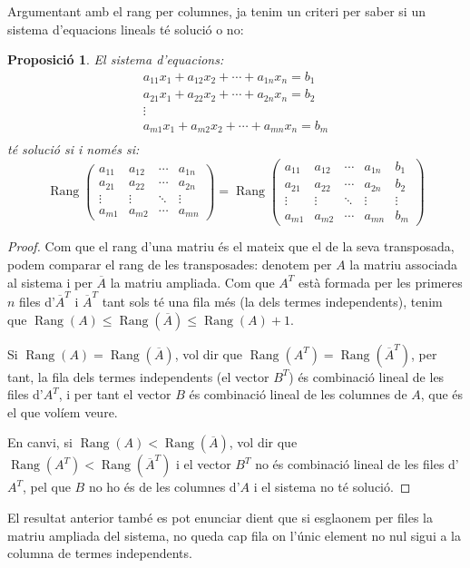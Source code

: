 \documentclass[a4paper,12pt,twoside]{article}
\newcommand{\1}{\mathbf{1}}
\newcommand{\0}{\mathbf{0}}
\DeclareMathOperator{\Rang}{Rang}
\newtheorem{proposicio}[teorema]{Proposició}
\theoremstyle{definition}
\theoremstyle{remark}
\begin{document}
Argumentant amb el rang per columnes, ja tenim un criteri per saber si un sistema d'equacions lineals té solució o no:
\begin{proposicio}
	El sistema d'equacions:
		$$
	\begin{matrix}
	a_{11}x_1+a_{12}x_2+ \cdots + a_{1n}x_n = b_1 \\
	a_{21}x_1+a_{22}x_2+ \cdots + a_{2n}x_n = b_2 \\
	\vdots \\
	a_{m1}x_1+a_{m2}x_2+ \cdots + a_{mn}x_n = b_m \\
	\end{matrix}
	$$
	té solució si i només si:
	$$\Rang \left(\begin{array}{cccc}
	a_{11} & a_{12} & \cdots & a_{1n} \\
	a_{21} & a_{22} & \cdots & a_{2n} \\
	\vdots & \vdots & \ddots & \vdots \\
	a_{m1} & a_{m2} & \cdots & a_{mn} 
	\end{array}\right) =
	\Rang \left(\begin{array}{ccccc}
	a_{11} & a_{12} & \cdots & a_{1n} & b_1 \\
	a_{21} & a_{22} & \cdots & a_{2n} & b_2 \\
	\vdots & \vdots & \ddots & \vdots & \vdots \\
	a_{m1} & a_{m2} & \cdots & a_{mn} & b_m 
	\end{array}\right)
	$$
\end{proposicio}
\begin{proof}
	Com que el rang d'una matriu és el mateix que el de la seva transposada, podem comparar el rang de les transposades: denotem per $A$ la matriu associada al sistema i per $\overline{A}$ la matriu ampliada. Com que $A^T$ està formada per les primeres $n$ files d'$\overline{A}^T$ i $\overline{A}^T$ tant sols té una fila més (la dels termes independents), tenim que $\Rang(A)\leq \Rang(\overline{A}) \leq \Rang(A)+1$.
	
	Si $\Rang(A)= \Rang(\overline{A})$, vol dir que $\Rang(A^T)= \Rang(\overline{A}^T)$, per tant, la fila dels termes independents (el vector $B^T$) és combinació lineal de les files d'$A^T$, i per tant el vector $B$ és combinació lineal de les columnes de $A$, que és el que volíem veure.
	
	En canvi, si  $\Rang(A)< \Rang(\overline{A})$, vol dir que $\Rang(A^T)< \Rang(\overline{A}^T)$ i el vector $B^T$ no és combinació lineal de les files d'$A^T$, pel que $B$ no ho és de les columnes d'$A$ i el sistema no té solució.
\end{proof}
El resultat anterior també es pot enunciar dient que si esglaonem per files la matriu ampliada del sistema, no queda cap fila on l'únic element no nul sigui a la columna de termes independents.
\end{document}
